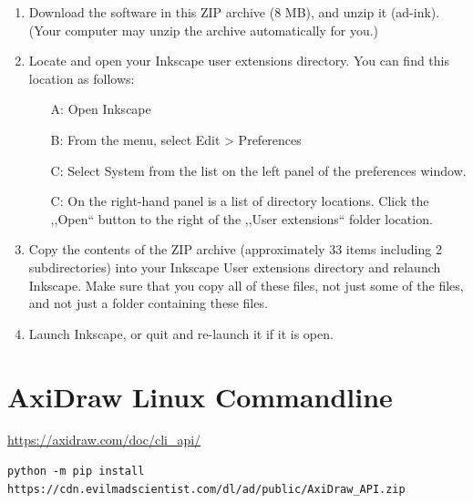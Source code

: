 \begin{enumerate}
  \item         Download the software in this ZIP archive (8 MB), and unzip it (ad-ink). (Your computer may unzip the archive automatically for you.)
  \item         Locate and open your Inkscape user extensions directory. You can find this location as follows:\begin{itemize}
  \item[A:]               Open Inkscape
  \item[B:]               From the menu, select Edit > Preferences
  \item[C:]               Select System from the list on the left panel of the preferences window.
  \item[C:]               On the right-hand panel is a list of directory locations. Click the ,,Open`` button to the right of the ,,User extensions`` folder location.
  \end{itemize}
  \item         Copy the contents of the ZIP archive (approximately 33 items including 2 subdirectories) into your Inkscape User extensions directory and relaunch Inkscape. Make sure that you copy all of these files, not just some of the files, and not just a folder containing these files.
  \item         Launch Inkscape, or quit and re-launch it if it is open.
\end{enumerate}


\section{AxiDraw Linux Commandline}
\url{https://axidraw.com/doc/cli_api/}
\begin{verbatim}
python -m pip install https://cdn.evilmadscientist.com/dl/ad/public/AxiDraw_API.zip
\end{verbatim}



